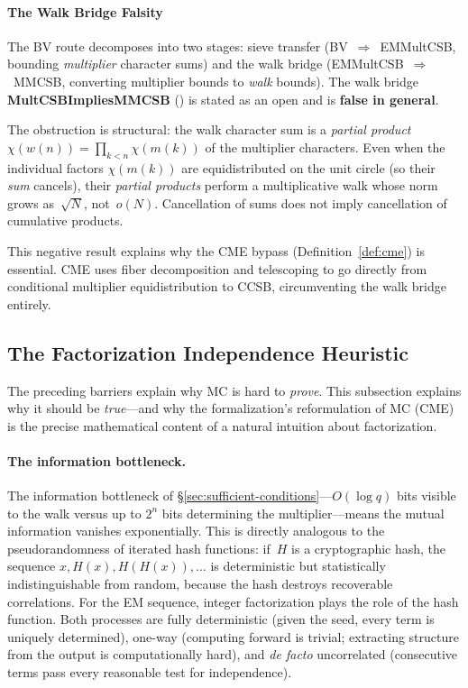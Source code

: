 \paragraph{The Walk Bridge Falsity}
\label{sec:walk-bridge-false}

The BV route decomposes into two stages: sieve transfer
(BV~$\Rightarrow$~EMMultCSB, bounding \emph{multiplier} character sums)
and the walk bridge (EMMultCSB~$\Rightarrow$~MMCSB, converting multiplier
bounds to \emph{walk} bounds).  The walk bridge
\textbf{MultCSBImpliesMMCSB}
()
is stated as an open  and is \textbf{false in general}.

The obstruction is structural: the walk character sum is a
\emph{partial product} $\chi(w(n)) = \prod_{k<n} \chi(m(k))$
of the multiplier characters.  Even when the individual factors
$\chi(m(k))$ are equidistributed on the unit circle (so their
\emph{sum} cancels), their \emph{partial products} perform a
multiplicative walk whose norm grows as~$\sqrt{N}$,
not~$o(N)$.  Cancellation of sums does not imply cancellation
of cumulative products.

This negative result explains why the CME bypass
(Definition~\ref{def:cme}) is essential.  CME uses fiber
decomposition and telescoping to go directly from conditional
multiplier equidistribution to CCSB, circumventing the walk bridge
entirely.


\subsection{The Factorization Independence Heuristic}
\label{sec:hash-heuristic}

The preceding barriers explain why MC is hard to \emph{prove}.  This
subsection explains why it should be \emph{true}---and why the
formalization's reformulation of MC (CME) is the precise
mathematical content of a natural intuition about factorization.

\paragraph{The information bottleneck.}
The information bottleneck of \S\ref{sec:sufficient-conditions}---$O(\log q)$
bits visible to the walk versus up to $2^n$ bits determining the
multiplier---means the mutual information vanishes exponentially.
This is directly analogous to the pseudorandomness of iterated hash
functions: if~$H$ is a cryptographic hash, the sequence
$x, H(x), H(H(x)), \ldots$ is deterministic but statistically
indistinguishable from random, because the hash destroys recoverable
correlations.  For the EM sequence, integer factorization plays the
role of the hash function.  Both processes are fully deterministic
(given the seed, every term is uniquely determined), one-way
(computing forward is trivial; extracting structure from the output
is computationally hard), and \emph{de facto} uncorrelated
(consecutive terms pass every reasonable test for independence).

